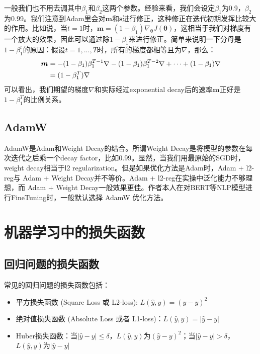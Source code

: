 \documentclass[lang=cn,newtx,10pt,scheme=chinese,color=black]{elegantbook}
\begin{document}
一般我们也不用去调其中$\beta_1$和$\beta_2$这两个参数。经验来看，我们会设定$\beta_1$为0.9，$\beta_2$为0.99。我们注意到Adam里会对$\bm{m}$和$\bm{s}$进行修正，这种修正在迭代初期发挥比较大的作用。比如说，当$t=1$时，$\bm{m}=(1 - \beta_1) \nabla_{\bm{\theta}}{J(\bm{\theta})}$，这相当于我们对梯度有一个放大的效果，因此可以通过除$1-\beta_1$来进行修正。简单来说明一下分母是$1-\beta_1^t$的原因：假设$t=1,...,T$时，所有的梯度都相等且为$\nabla$，那么：
\begin{align}
  \label{adam_beta}
  \bm{m} &= -(1-\beta_1)\beta_1^{T-1}\nabla - (1-\beta_1)\beta_1^{T-2} \nabla + \dots + (1-\beta_1)\nabla \\
         &= (1 - \beta_1^T) \nabla  \notag
\end{align}
可以看出，我们期望的梯度$\nabla$和实际经过exponential decay后的速率$\bm{m}$正好是$1-\beta_1^T$的比例关系。

\section{AdamW}

AdamW是Adam和Weight Decay的结合。所谓Weight Decay是将模型的参数在每次迭代之后乘一个decay factor，比如0.99。显然，当我们用最原始的SGD时，weight decay相当于l2 regularization。但是如果优化方法是Adam时，Adam + l2-reg与 Adam + Weight Decay并不等价。Adam + l2-reg在实操中泛化能力不够理想，而 Adam + Weight Decay一般效果更佳。作者本人在对BERT等NLP模型进行FineTuning时，一般默认选择 AdamW 优化方法。


\chapter{机器学习中的损失函数}

\section{回归问题的损失函数}

常见的回归问题的损失函数包括：
\begin{itemize}
  \item 平方损失函数 (Square Loss 或 L2-loss): $L(\hat{y}, y) = (\hat{y} - y)^2$
  \item 绝对值损失函数 (Absolute Loss 或者 L1-loss)：$L(\hat{y}, y) = |\hat{y} - y|$
  \item Huber损失函数：当$|\hat{y} - y|\leq\delta$，$L(\hat{y}, y)$为$(\hat{y} - y)^2$；当$|\hat{y} - y|>\delta$，$L(\hat{y}, y)$为$|\hat{y} - y|$
\end{itemize}
\end{document}
